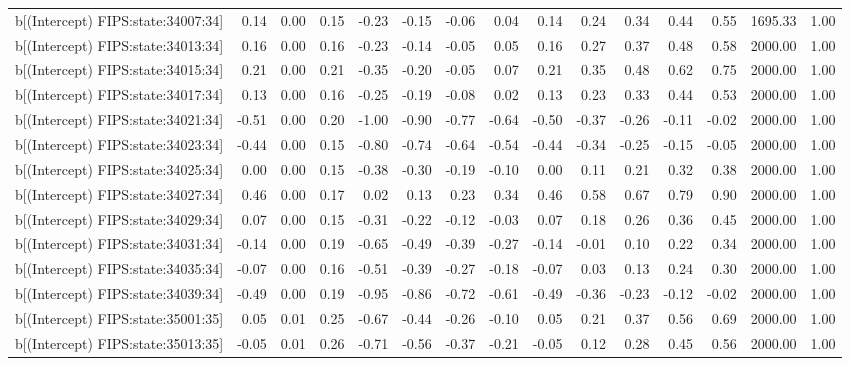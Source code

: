 \begin{table}[ht]
\begin{tabular}{rrrrrrrrrrrrrrr}
  b[(Intercept) FIPS:state:34007:34] & 0.14 & 0.00 & 0.15 & -0.23 & -0.15 & -0.06 & 0.04 & 0.14 & 0.24 & 0.34 & 0.44 & 0.55 & 1695.33 & 1.00 \\ 
  b[(Intercept) FIPS:state:34013:34] & 0.16 & 0.00 & 0.16 & -0.23 & -0.14 & -0.05 & 0.05 & 0.16 & 0.27 & 0.37 & 0.48 & 0.58 & 2000.00 & 1.00 \\ 
  b[(Intercept) FIPS:state:34015:34] & 0.21 & 0.00 & 0.21 & -0.35 & -0.20 & -0.05 & 0.07 & 0.21 & 0.35 & 0.48 & 0.62 & 0.75 & 2000.00 & 1.00 \\ 
  b[(Intercept) FIPS:state:34017:34] & 0.13 & 0.00 & 0.16 & -0.25 & -0.19 & -0.08 & 0.02 & 0.13 & 0.23 & 0.33 & 0.44 & 0.53 & 2000.00 & 1.00 \\ 
  b[(Intercept) FIPS:state:34021:34] & -0.51 & 0.00 & 0.20 & -1.00 & -0.90 & -0.77 & -0.64 & -0.50 & -0.37 & -0.26 & -0.11 & -0.02 & 2000.00 & 1.00 \\ 
  b[(Intercept) FIPS:state:34023:34] & -0.44 & 0.00 & 0.15 & -0.80 & -0.74 & -0.64 & -0.54 & -0.44 & -0.34 & -0.25 & -0.15 & -0.05 & 2000.00 & 1.00 \\ 
  b[(Intercept) FIPS:state:34025:34] & 0.00 & 0.00 & 0.15 & -0.38 & -0.30 & -0.19 & -0.10 & 0.00 & 0.11 & 0.21 & 0.32 & 0.38 & 2000.00 & 1.00 \\ 
  b[(Intercept) FIPS:state:34027:34] & 0.46 & 0.00 & 0.17 & 0.02 & 0.13 & 0.23 & 0.34 & 0.46 & 0.58 & 0.67 & 0.79 & 0.90 & 2000.00 & 1.00 \\ 
  b[(Intercept) FIPS:state:34029:34] & 0.07 & 0.00 & 0.15 & -0.31 & -0.22 & -0.12 & -0.03 & 0.07 & 0.18 & 0.26 & 0.36 & 0.45 & 2000.00 & 1.00 \\ 
  b[(Intercept) FIPS:state:34031:34] & -0.14 & 0.00 & 0.19 & -0.65 & -0.49 & -0.39 & -0.27 & -0.14 & -0.01 & 0.10 & 0.22 & 0.34 & 2000.00 & 1.00 \\ 
  b[(Intercept) FIPS:state:34035:34] & -0.07 & 0.00 & 0.16 & -0.51 & -0.39 & -0.27 & -0.18 & -0.07 & 0.03 & 0.13 & 0.24 & 0.30 & 2000.00 & 1.00 \\ 
  b[(Intercept) FIPS:state:34039:34] & -0.49 & 0.00 & 0.19 & -0.95 & -0.86 & -0.72 & -0.61 & -0.49 & -0.36 & -0.23 & -0.12 & -0.02 & 2000.00 & 1.00 \\ 
  b[(Intercept) FIPS:state:35001:35] & 0.05 & 0.01 & 0.25 & -0.67 & -0.44 & -0.26 & -0.10 & 0.05 & 0.21 & 0.37 & 0.56 & 0.69 & 2000.00 & 1.00 \\ 
  b[(Intercept) FIPS:state:35013:35] & -0.05 & 0.01 & 0.26 & -0.71 & -0.56 & -0.37 & -0.21 & -0.05 & 0.12 & 0.28 & 0.45 & 0.56 & 2000.00 & 1.00 \\ 

\end{tabular}
\end{table}
